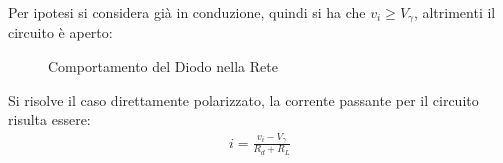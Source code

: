 \documentclass{article}
\numberwithin{equation}{subsection}
\begin{document}
Per ipotesi si considera già in conduzione, quindi si ha che $v_i\geq V_{\gamma}$, altrimenti il circuito è aperto: 
\begin{figure}[H]%
    \centering
    \qquad
    \caption{Comportamento del Diodo nella Rete}
    \label{fig:transcaratteristica-polarizzazione}
\end{figure}
Si risolve il caso direttamente polarizzato, la corrente passante per il circuito risulta essere:
\begin{gather*}
    i=\displaystyle\frac{v_i-V_{\gamma}}{R_d+R_L}
\end{gather*}
\end{document}
